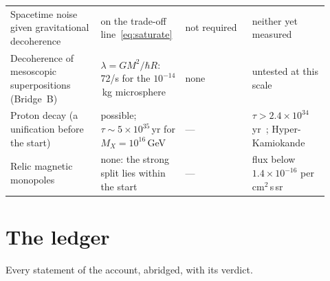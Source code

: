 \documentclass[11pt,a4paper]{article}
\theoremstyle{definition}
\theoremstyle{remark}
\newcommand{\nw}[1]{{\color{newc}#1}}
\newcommand{\vtag}{{\color{newc}\textsf{\scriptsize[v5.1]}}}
\theoremstyle{definition}
\begin{document}
\begin{center}
\begin{longtable}{@{}p{0.27\linewidth}p{0.22\linewidth}p{0.2\linewidth}p{0.23\linewidth}@{}}
Spacetime noise given gravitational decoherence & on the trade-off line~\eqref{eq:saturate} & not required & neither yet measured \\
Decoherence of mesoscopic superpositions (Bridge~B) & $\lambda=GM^2/\hbar R$: 72/s for the $10^{-14}$\,kg microsphere & none & untested at
this scale \\
\nw{\vtag{} Proton decay (a unification before the start)} & \nw{possible; $\tau\sim5\times10^{35}$\,yr for $M_X=10^{16}$\,GeV} & \nw{---} &
\nw{$\tau>2.4\times10^{34}$\,yr~\cite{superk}; Hyper-Kamiokande} \\
\nw{\vtag{} Relic magnetic monopoles} & \nw{none: the strong split lies within the start} & \nw{---} & \nw{flux below $1.4\times10^{-16}$ per
cm$^2$\,s\,sr~\cite{macro}} \\
\bottomrule
\end{longtable}
\end{center}

\section{The ledger}\label{sec:ledger}

Every statement of the account, abridged, with its verdict.
\end{document}
